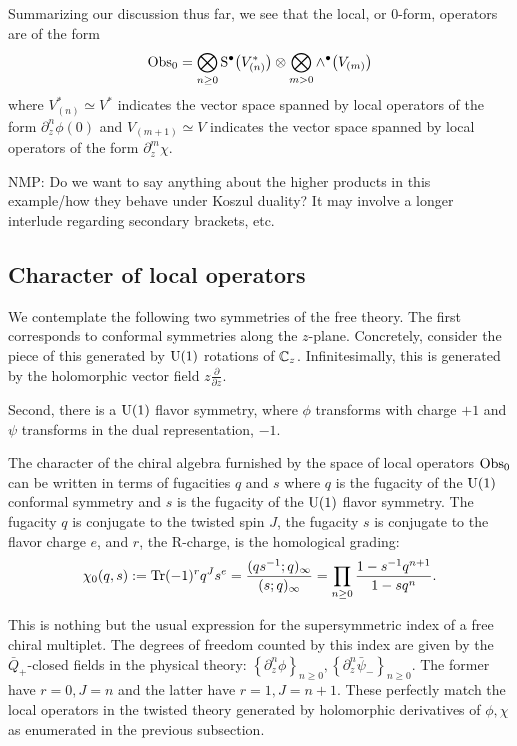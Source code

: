 \documentclass[11pt]{amsart}
\def\natalie#1{{\textcolor{green!65!black}{NMP: {#1}}}}
\begin{document}
Summarizing our discussion thus far, we see that the local, or 0-form, operators are of the form
\[
{\rm Obs}_0 = \bigotimes_{n \geq 0} {\rm S}^\bullet \big(V^*_{(n)}\big) \otimes \bigotimes_{m > 0} \wedge^\bullet \big(V_{(m)}\big)
\]
where $V_{(n)}^* \simeq V^*$ indicates the vector space spanned by local operators of the form $\partial^n_{z} \phi(0)$ and $V_{(m+1)} \simeq V$ indicates the vector space spanned by local operators of the form $\partial^{m}_z \chi$. 

\natalie{Do we want to say anything about the higher products in this example/how they behave under Koszul duality? It may involve a longer interlude regarding secondary brackets, etc.}

\subsection*{Character of local operators}

We contemplate the following two symmetries of the free theory.
The first corresponds to conformal symmetries along the $z$-plane. 
Concretely, consider the piece of this generated by ${\rm U}(1)$ rotations of $\mathbb C_z$.
Infinitesimally, this is generated by the holomorphic vector field $z \frac{\partial}{\partial z}$. 

Second, there is a ${\rm U}(1)$ flavor symmetry, where $\phi$ transforms with charge $+1$ and $\psi$ transforms in the dual representation, $-1$.

The character of the chiral algebra furnished by the space of local operators ${\rm Obs}_0$ can be written in terms of fugacities $q$ and $s$ where $q$ is the fugacity of the ${\rm U}(1)$ conformal symmetry and $s$ is the fugacity of the ${\rm U}(1)$ flavor symmetry. The fugacity $q$ is conjugate to the twisted spin $J$, the fugacity $s$ is conjugate to the flavor charge $e$, and $r$, the R-charge, is the homological grading:
\[
\chi_0(q , s) := \operatorname{Tr} (-1)^r q^J s^e =  \frac{(q s^{-1} ; q)_\infty}{(s ; q)_\infty}  = \prod_{n \geq 0} \frac{1 - s^{-1} q^{n+1}}{1 - s q^n}.
\]

This is nothing but the usual expression for the supersymmetric index of a free chiral multiplet. The degrees of freedom counted by this index are given by the $\bar{Q}_+$-closed fields in the physical theory: $\left\lbrace \partial_z^n \phi \right\rbrace_{n \geq 0}, \left\lbrace \partial_z^n \bar{\psi}_- \right\rbrace_{n \geq 0}$. The former have $r=0, J = n$ and the latter have $r=1, J= n+1$. These perfectly match the local operators in the twisted theory generated by holomorphic derivatives of $\phi, \chi$ as enumerated in the previous subsection.
\end{document}
